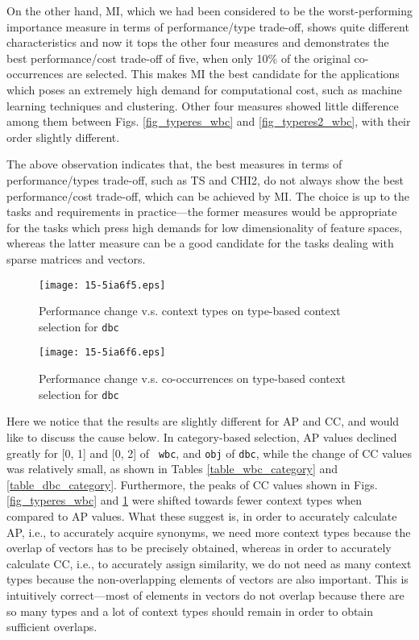\documentclass[english]{jnlp_1.4}
\begin{document}
On the other hand, MI, which we had been considered to be the
worst-performing importance measure in terms of performance/type
trade-off, shows quite different characteristics and now it tops the
other four measures and demonstrates the best performance/cost
trade-off of five, when only 10\% of the original co-occurrences are
selected. This makes MI the best candidate for the applications which
poses an extremely high demand for computational cost, such as machine
learning techniques and clustering. Other four measures showed little
difference among them between Figs.  \ref{fig_typeres_wbc} and
\ref{fig_typeres2_wbc}, with their order slightly different.

The above observation indicates that, the best measures in terms of
performance/types trade-off, such as TS and CHI2, do not always show
the best performance/cost trade-off, which can be achieved by MI.  The
choice is up to the tasks and requirements in practice---the former
measures would be appropriate for the tasks which press high demands
for low dimensionality of feature spaces, whereas the latter measure
can be a good candidate for the tasks dealing with sparse matrices and
vectors.



\begin{figure}[b]
\begin{center}
\texttt{[image: 15-5ia6f5.eps]}
\end{center}
\caption{Performance change v.s. context types on type-based context selection for {\tt dbc}}
\label{fig_typeres_dbc}
\end{figure}
\begin{figure}[b]
\begin{center}
\texttt{[image: 15-5ia6f6.eps]}
\end{center}
\caption{Performance change v.s. co-occurrences on type-based context selection for {\tt dbc}}
\label{fig_typeres2_dbc}
\end{figure}

Here we notice that the results are slightly different for AP and CC,
and would like to discuss the cause below. In category-based
selection, AP values declined greatly for [0, 1] and [0, 2] of {\tt
wbc}, and {\tt obj} of {\tt dbc}, while the change of CC values was
relatively small, as shown in Tables {\ref{table_wbc_category}} and
{\ref{table_dbc_category}}. Furthermore, the peaks of CC values shown
in Figs. {\ref{fig_typeres_wbc}} and {\ref{fig_typeres_dbc}} were
shifted towards fewer context types when compared to AP values. What
these suggest is, in order to accurately calculate AP, i.e., to
accurately acquire synonyms, we need more context types because the
overlap of vectors has to be precisely obtained, whereas in order to
accurately calculate CC, i.e., to accurately assign similarity, we do
not need as many context types because the non-overlapping elements of
vectors are also important.  This is intuitively correct---most of
elements in vectors do not overlap because there are so many types and
a lot of context types should remain in order to obtain sufficient
overlaps.
\end{document}
